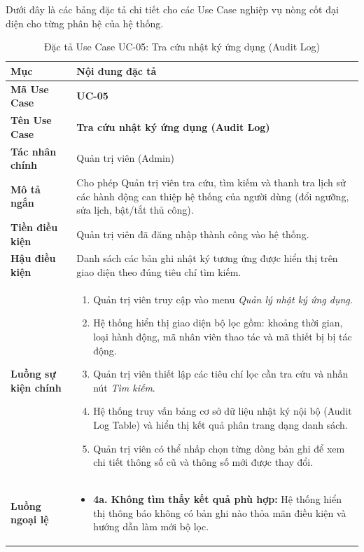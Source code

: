 Dưới đây là các bảng đặc tả chi tiết cho các Use Case nghiệp vụ nòng cốt đại diện cho từng phân hệ của hệ thống.

\begin{table}[H]
\centering
\small
\begin{tabularx}{\textwidth}{|p{3.2cm}|X|}
\hline
\textbf{Mục} & \textbf{Nội dung đặc tả} \\ \hline
\textbf{Mã Use Case} & \textbf{UC-05} \\ \hline
\textbf{Tên Use Case} & \textbf{Tra cứu nhật ký ứng dụng (Audit Log)} \\ \hline
\textbf{Tác nhân chính} & Quản trị viên (Admin) \\ \hline
\textbf{Mô tả ngắn} & Cho phép Quản trị viên tra cứu, tìm kiếm và thanh tra lịch sử các hành động can thiệp hệ thống của người dùng (đổi ngưỡng, sửa lịch, bật/tắt thủ công). \\ \hline
\textbf{Tiền điều kiện} & Quản trị viên đã đăng nhập thành công vào hệ thống. \\ \hline
\textbf{Hậu điều kiện} & Danh sách các bản ghi nhật ký tương ứng được hiển thị trên giao diện theo đúng tiêu chí tìm kiếm. \\ \hline
\textbf{Luồng sự kiện chính} & 
\begin{enumerate}[leftmargin=*, nosep]
    \item Quản trị viên truy cập vào menu \textit{Quản lý nhật ký ứng dụng}.
    \item Hệ thống hiển thị giao diện bộ lọc gồm: khoảng thời gian, loại hành động, mã nhân viên thao tác và mã thiết bị bị tác động.
    \item Quản trị viên thiết lập các tiêu chí lọc cần tra cứu và nhấn nút \textit{Tìm kiếm}.
    \item Hệ thống truy vấn bảng cơ sở dữ liệu nhật ký nội bộ (Audit Log Table) và hiển thị kết quả phân trang dạng danh sách.
    \item Quản trị viên có thể nhấp chọn từng dòng bản ghi để xem chi tiết thông số cũ và thông số mới được thay đổi.
\end{enumerate} \\ \hline
\textbf{Luồng ngoại lệ} & 
\begin{itemize}[leftmargin=*, nosep]
    \item \textbf{4a. Không tìm thấy kết quả phù hợp:} Hệ thống hiển thị thông báo không có bản ghi nào thỏa mãn điều kiện và hướng dẫn làm mới bộ lọc.
\end{itemize} \\ \hline
\end{tabularx}
\caption{Đặc tả Use Case UC-05: Tra cứu nhật ký ứng dụng (Audit Log)}
\label{tab:uc_05}
\end{table}

